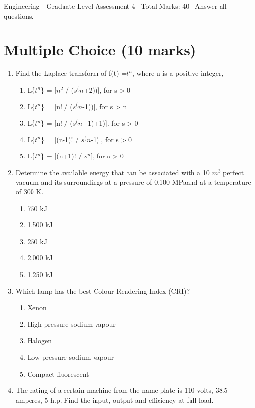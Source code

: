 \documentclass[12pt]{article}
\begin{document}
\begin{center}
Engineering - Graduate Level Assessment 4 \
Total Marks: 40 \
Answer all questions.
\end{center}

\section*{Multiple Choice (10 marks)}
\begin{enumerate}[label=\arabic*.]
\item Find the Laplace transform of f(t) =$t^n$, where n is a positive integer,
\begin{enumerate}[label=(\alph*)]
    \item L\{$t^n$\} = [$n^2$ / ($s^(n$+2))], for s \textgreater{} 0
    \item L\{$t^n$\} = [n! / ($s^(n$-1))], for s \textgreater{} n
    \item L\{$t^n$\} = [n! / ($s^(n$+1)+1)], for s \textgreater{} 0
    \item L\{$t^n$\} = [(n-1)! / $s^(n$-1)], for s \textgreater{} 0
    \item L\{$t^n$\} = [(n+1)! / $s^n$], for s \textgreater{} 0
\end{enumerate}
\item Determine the available energy that can be associated with a 10 $m^3$ perfect vacuum and its surroundings at a pressure of 0.100 MPaand at a temperature of 300 K.
\begin{enumerate}[label=(\alph*)]
    \item 750 kJ
    \item 1,500 kJ
    \item 250 kJ
    \item 2,000 kJ
    \item 1,250 kJ
\end{enumerate}
\item Which lamp has the best Colour Rendering Index (CRI)?
\begin{enumerate}[label=(\alph*)]
    \item Xenon
    \item High pressure sodium vapour
    \item Halogen
    \item Low pressure sodium vapour
    \item Compact fluorescent
\end{enumerate}
\item The rating of a certain machine from the name-plate is 110 volts, 38.5 amperes, 5 h.p. Find the input, output and efficiency at full load.

\end{enumerate}
\end{document}
